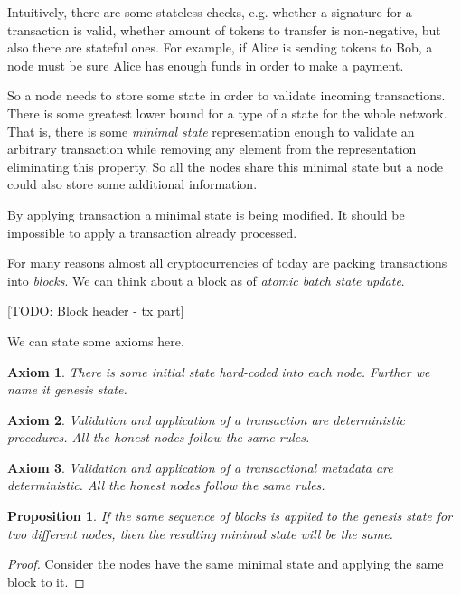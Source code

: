 \documentclass[]{report}   %
\newtheorem{axiom}{Axiom}
\newtheorem{proposition}{Proposition}
\begin{document}
	Intuitively, there are some stateless checks, e.g. whether a signature for a transaction is valid, whether amount of tokens to transfer is non-negative, but also there are stateful ones. For example, if Alice is sending tokens to Bob, a node must be sure Alice has enough funds in order to make a payment.

	So a node needs to store some state in order to validate incoming transactions. There is some greatest lower bound for a type of a state for the whole network. That is, there is some \textit{minimal state} representation enough to validate an arbitrary transaction while removing any element from the representation eliminating this property. So all the nodes share this minimal state but a node could also store some additional information. 

	By applying transaction a minimal state is being modified. It should be impossible to apply a transaction already processed. 

	For many reasons almost all cryptocurrencies of today are packing transactions into \textit{blocks}. We can think about a block as of \textit{atomic batch state update}. 

    [TODO: Block header - tx part]


	We can state some axioms here.

	\begin{axiom}
	 There is some initial state hard-coded into each node. Further we name it \textit{genesis state}.
	\end{axiom}

    \begin{axiom} 
     Validation and application of a transaction are deterministic procedures. All the honest nodes follow the same rules. 
    \end{axiom}

	\begin{axiom} 
	 Validation and application of a transactional metadata are deterministic. All the honest nodes follow the same rules. 
	\end{axiom}

	\begin{proposition} If the same sequence of blocks is applied to the genesis state for two different nodes, then the resulting minimal state will be the same.
	\end{proposition}	
	\begin{proof} Consider the nodes have the same minimal state and applying the same block to it. \end{proof}
\end{document}

